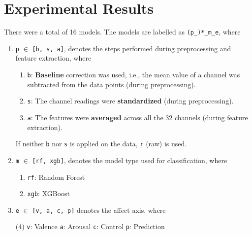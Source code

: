 
\chapter{Experimental Results} %

\label{Chapter7} %


There were a total of 16 models. The models are labelled as \texttt{(p\_)*\_{m}\_{e}}, where
\begin{enumerate}
    \item \texttt{p} $\in$ \texttt{[b, s, a]}, denotes the steps performed during preprocessing and feature extraction, where
    \begin{enumerate}
        \item \texttt{b}: \textbf{Baseline} correction was used, i.e., the mean value of a channel was subtracted from the data points (during preprocessing).
        \item \texttt{s}: The channel readings were \textbf{standardized} (during preprocessing).
        \item \texttt{a}: The features were \textbf{averaged} across all the 32 channels (during feature extraction).
    \end{enumerate}
    If neither \texttt{b} nor \texttt{s} is applied on the data, \texttt{r} (raw) is used.
    \item \texttt{m} $\in$ \texttt{[rf, xgb]}, denotes the model type used for classification, where
    \begin{enumerate}
        \item \texttt{rf}: Random Forest
        \item \texttt{xgb}: XGBoost
    \end{enumerate}
    \item \texttt{e} $\in$ \texttt{[v, a, c, p]} denotes the affect axis, where
    \begin{tasks}[label-align=left, label-offset={0mm}, label-width={5mm}, item-indent={5mm}, label-format={\bfseries}, column-sep=10mm](4)
        \task \texttt{v}: Valence
        \task \texttt{a}: Arousal
        \task \texttt{c}: Control
        \task \texttt{p}: Prediction
    \end{tasks}
\end{enumerate}

